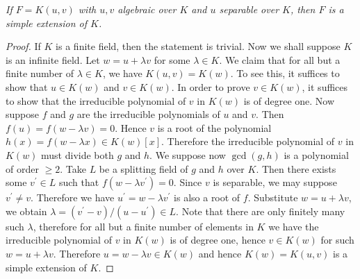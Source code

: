 \begin{problem}\em
If $F=K(u, v)$ with $u, v$ algebraic over $K$ and $u$ separable over $K$, then $F$ is a simple extension of $K$.
\end{problem}
\begin{proof}
If $K$ is a finite field, then the statement is trivial. Now we shall suppose $K$ is an infinite field. Let $w=u+\lambda v$ for some $\lambda\in K$. We claim that for all but a finite number of $\lambda\in K$, we have $K(u,v)=K(w)$. To see this, it suffices to show that $u\in K(w)$ and $v\in K(w)$. In order to prove $v\in K(w)$, it suffices to show that the irreducible polynomial of $v$ in $K(w)$ is of degree one. Now suppose $f$ and $g$ are the irreducible polynomials of $u$ and $v$. Then $f(u)=f(w-\lambda v)=0$. Hence $v$ is a root of the polynomial $h(x)=f(w-\lambda x)\in K(w)[x]$. Therefore the irreducible polynomial of $v$ in $K(w)$ must divide both $g$ and $h$. We suppose now $\gcd(g,h)$ is a polynomial of order $\ge 2$. Take $L$ be a splitting field of $g$ and $h$ over $K$. Then there exists some $v^\prime\in L$ such that $f(w-\lambda v^\prime)=0$. Since $v$ is separable, we may suppose $v^\prime\ne v$. Therefore we have $u^\prime=w-\lambda v^\prime$ is also a root of $f$. Substitute $w=u+\lambda v$, we obtain $\lambda=(v^\prime-v)/(u-u^\prime)\in L$. Note that there are only finitely many such $\lambda$, therefore for all but a finite number of elements in $K$ we have the irreducible polynomial of $v$ in $K(w)$ is of degree one, hence $v\in K(w)$ for such $w=u+\lambda v$. Therefore $u=w-\lambda v\in K(w)$ and hence $K(w)=K(u,v)$ is a simple extension of $K$.
\end{proof}
